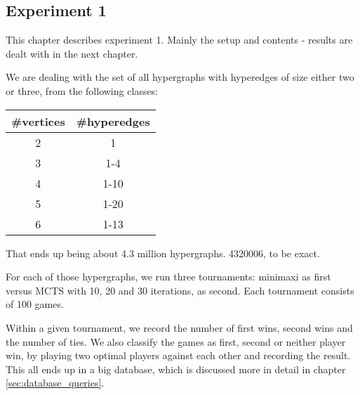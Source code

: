 
\subsection{Experiment 1}
\label{sec:experiment1}

This chapter describes experiment 1. Mainly the setup and contents - results are dealt with in the next chapter.

We are dealing with the set of all hypergraphs with hyperedges of size either two or three, from the following classes:

\begin{tabular}{ c | c }
\#vertices & \#hyperedges \\ \hline
2&1 \\ \hline
3&1-4 \\ \hline
4&1-10 \\ \hline
5&1-20 \\ \hline
6&1-13 \\ \hline
\end{tabular}


That ends up being about 4.3 million hypergraphs. 4320006, to be exact.

For each of those hypergraphs, we run three tournaments: minimaxi as first versus MCTS with 10, 20 and 30 iterations, as second.
Each tournament consists of 100 games.

Within a given tournament, we record the number of first wins, second wins and the number of ties.
We also classify the games as first, second or neither player win, by playing two optimal players against each other and recording the result.
This all ends up in a big database, which is discussed more in detail in chapter \ref{sec:database_queries}.
